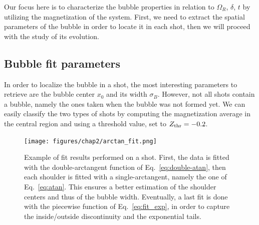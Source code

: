 Our focus here is to characterize the bubble properties in relation to $\Omega_R$, $\delta$, $t$ by utilizing the magnetization of the system. First, we need to extract the spatial parameters of the bubble in order to locate it in each shot, then we will proceed with the study of its evolution.

\subsection{Bubble fit parameters}
In order to localize the bubble in a shot, the most interesting parameters to retrieve are the bubble center $x_0$ and its width $\sigma_B$.
However, not all shots contain a bubble, namely the ones taken when the bubble was not formed yet. We can easily classify the two types of shots by computing the magnetization average in the central region and using a threshold value, set to $Z_{\rm thr} = -0.2$. 

\begin{figure}[h!]
    \centering
    \texttt{[image: figures/chap2/arctan\_fit.png]}
    \caption{Example of fit results performed on a shot. First, the data is fitted with the double-arctangent function of Eq.\ \eqref{eq:double-atan}, then each shoulder is fitted with a single-arctangent, namely the one of Eq.\ \eqref{eq:atan}. This ensures a better estimation of the shoulder centers and thus of the bubble width. Eventually, a last fit is done with the piecewise function of Eq.\ \eqref{eq:fit_exp}, in order to capture the inside/outside discontinuity and the exponential tails.}
    \label{fig:atan-fit}
\end{figure}

